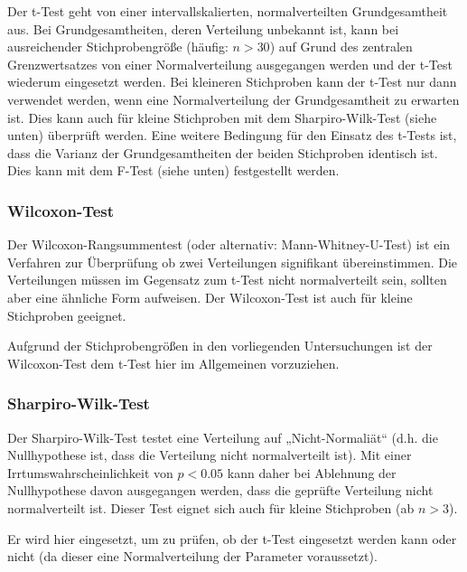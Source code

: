 Der t-Test geht von einer intervallskalierten, normalverteilten Grundgesamtheit aus. Bei Grundgesamtheiten, deren Verteilung unbekannt ist, kann bei ausreichender Stichprobengröße (häufig: $n>30$) auf Grund des zentralen Grenzwertsatzes von einer Normalverteilung ausgegangen werden und der t-Test wiederum eingesetzt werden. Bei kleineren Stichproben kann der t-Test nur dann verwendet werden, wenn eine Normalverteilung der Grundgesamtheit zu erwarten ist. Dies kann auch für kleine Stichproben mit dem Sharpiro-Wilk-Test (siehe unten) überprüft werden. Eine weitere Bedingung für den Einsatz des t-Tests ist, dass die Varianz der Grundgesamtheiten der beiden Stichproben identisch ist. Dies kann mit dem F-Test (siehe unten) festgestellt werden.


\subsubsection{Wilcoxon-Test} %
\label{ssub:wilcoxon_text}
Der Wilcoxon-Rangsummentest (oder alternativ: Mann-Whitney-U-Test) ist ein Verfahren zur Überprüfung ob zwei Verteilungen signifikant übereinstimmen. Die Verteilungen müssen im Gegensatz zum t-Test nicht normalverteilt sein, sollten aber eine ähnliche Form aufweisen. Der Wilcoxon-Test ist auch für kleine Stichproben geeignet.

Aufgrund der Stichprobengrößen in den vorliegenden Untersuchungen ist der Wilcoxon-Test dem t-Test hier im Allgemeinen vorzuziehen. 


\subsubsection{Sharpiro-Wilk-Test} %
\label{ssub:sharpiro_wilk_test}

Der Sharpiro-Wilk-Test \citep{Shapiro65} testet eine Verteilung auf „Nicht-Normaliät“ (d.h. die Nullhypothese ist, dass die Verteilung nicht normalverteilt ist). Mit einer Irrtumswahrscheinlichkeit von $p<0.05$ kann daher bei Ablehnung der Nullhypothese davon ausgegangen werden, dass die geprüfte Verteilung nicht normalverteilt ist. Dieser Test eignet sich auch für kleine Stichproben (ab $n>3$).

Er wird hier eingesetzt, um zu prüfen, ob der t-Test eingesetzt werden kann oder nicht (da dieser eine Normalverteilung der Parameter voraussetzt).

